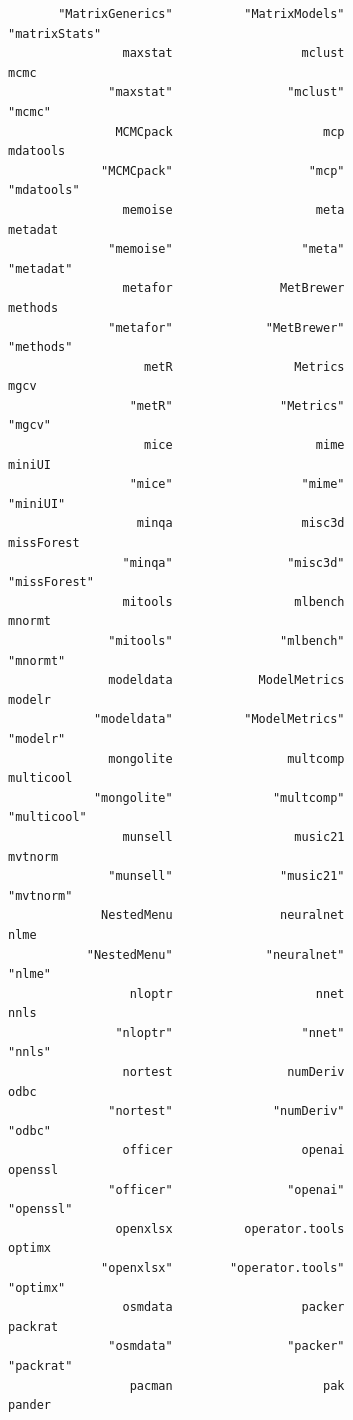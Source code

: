 \documentclass[
  letterpaper,
  DIV=11,
  numbers=noendperiod]{scrreprt}
\begin{document}
\begin{verbatim}
       "MatrixGenerics"          "MatrixModels"           "matrixStats" 
                maxstat                  mclust                    mcmc 
              "maxstat"                "mclust"                  "mcmc" 
               MCMCpack                     mcp                mdatools 
             "MCMCpack"                   "mcp"              "mdatools" 
                memoise                    meta                 metadat 
              "memoise"                  "meta"               "metadat" 
                metafor               MetBrewer                 methods 
              "metafor"             "MetBrewer"               "methods" 
                   metR                 Metrics                    mgcv 
                 "metR"               "Metrics"                  "mgcv" 
                   mice                    mime                  miniUI 
                 "mice"                  "mime"                "miniUI" 
                  minqa                  misc3d              missForest 
                "minqa"                "misc3d"            "missForest" 
                mitools                 mlbench                  mnormt 
              "mitools"               "mlbench"                "mnormt" 
              modeldata            ModelMetrics                  modelr 
            "modeldata"          "ModelMetrics"                "modelr" 
              mongolite                multcomp               multicool 
            "mongolite"              "multcomp"             "multicool" 
                munsell                 music21                 mvtnorm 
              "munsell"               "music21"               "mvtnorm" 
             NestedMenu               neuralnet                    nlme 
           "NestedMenu"             "neuralnet"                  "nlme" 
                 nloptr                    nnet                    nnls 
               "nloptr"                  "nnet"                  "nnls" 
                nortest                numDeriv                    odbc 
              "nortest"              "numDeriv"                  "odbc" 
                officer                  openai                 openssl 
              "officer"                "openai"               "openssl" 
               openxlsx          operator.tools                  optimx 
             "openxlsx"        "operator.tools"                "optimx" 
                osmdata                  packer                 packrat 
              "osmdata"                "packer"               "packrat" 
                 pacman                     pak                  pander 

\end{verbatim}
\end{document}
